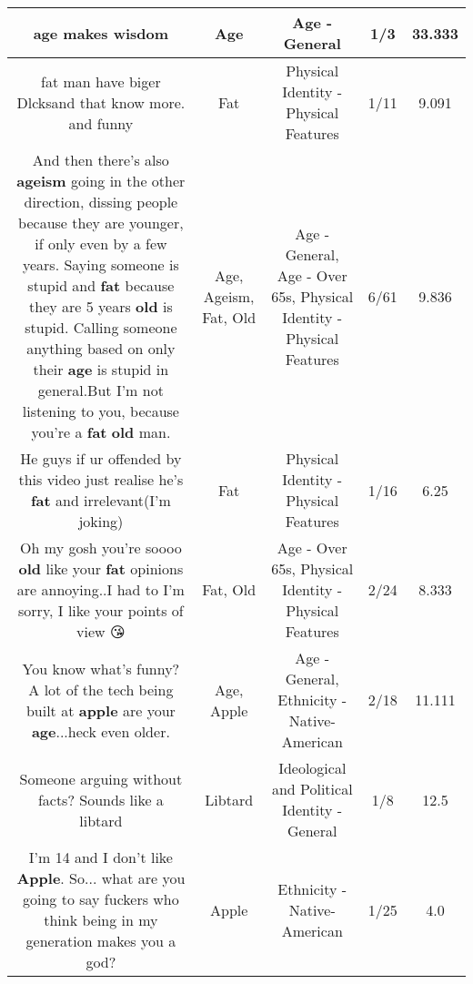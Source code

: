 \documentclass[11pt]{article}
\newlength\mylength
\begin{document}
\begin{center}
\begin{longtable}{|C{.65\mylength}|C{.30\mylength}|C{.12\mylength}|C{.12\mylength}|C{.12\mylength}|}
  \small age makes wisdom\normalsize   & Age & Age - General & 1/3 & 33.333 \\  \hline
  \small fat man have biger Dlcksand that know more. and funny\normalsize   & Fat & Physical Identity - Physical Features & 1/11 & 9.091 \\  \hline
  \small And then there's also \textbf{ageism} going in the other direction, dissing people because they are younger, if only even by a few years. Saying someone is stupid and \textbf{fat} because they are 5 years \textbf{old} is stupid. Calling someone anything based on only their \textbf{age} is stupid in general.But I'm not listening to you, because you're a \textbf{fat} \textbf{old} man.\normalsize   & Age, Ageism, Fat, Old & Age - General, Age - Over 65s, Physical Identity - Physical Features & 6/61 & 9.836 \\  \hline
  \small He guys if ur offended by this video just realise he's \textbf{fat} and irrelevant(I'm joking)\normalsize   & Fat & Physical Identity - Physical Features & 1/16 & 6.25 \\  \hline
  \small Oh my gosh you're soooo \textbf{old} like your \textbf{fat} opinions are annoying..I had to I'm sorry, I like your points of view 😘\normalsize   & Fat, Old & Age - Over 65s, Physical Identity - Physical Features & 2/24 & 8.333 \\  \hline
  \small You know what's funny? A lot of the tech being built at \textbf{apple} are your \textbf{age}...heck even older.\normalsize   & Age, Apple & Age - General, Ethnicity - Native-American & 2/18 & 11.111 \\  \hline
  \small Someone arguing without facts? Sounds like a libtard\normalsize   & Libtard &  Ideological and Political Identity - General & 1/8 & 12.5 \\  \hline
  \small I'm 14 and I don't like \textbf{Apple}. So... what are you going to say fuckers who think being in my generation makes you a god?\normalsize   & Apple & Ethnicity - Native-American & 1/25 & 4.0 \\  \hline

\end{longtable}
\end{center}
\end{document}
